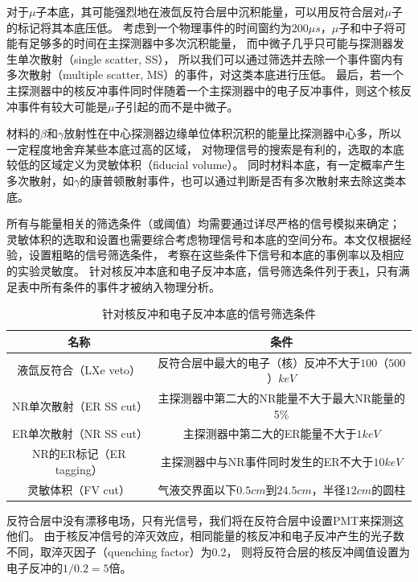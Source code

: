 对于$\mu$子本底，其可能强烈地在液氙反符合层中沉积能量，可以用反符合层对$\mu$子的标记将其本底压低。
考虑到一个物理事件的时间窗约为$200\mu s$，$\mu$子和中子将可能有足够多的时间在主探测器中多次沉积能量，
而中微子几乎只可能与探测器发生单次散射（single scatter, SS），
所以我们可以通过筛选并去除一个事件窗内有多次散射（multiple scatter, MS）的事件，对这类本底进行压低。
最后，若一个主探测器中的核反冲事件同时伴随着一个主探测器中的电子反冲事件，则这个核反冲事件有较大可能是$\mu$子引起的而不是中微子。

材料的$\beta$和$\gamma$放射性在中心探测器边缘单位体积沉积的能量比探测器中心多，所以一定程度地舍弃某些本底过高的区域，
对物理信号的搜索是有利的，选取的本底较低的区域定义为灵敏体积（fiducial volume）。
同时材料本底，有一定概率产生多次散射，如$\gamma$的康普顿散射事件，也可以通过判断是否有多次散射来去除这类本底。

所有与能量相关的筛选条件（或阈值）均需要通过详尽严格的信号模拟来确定；
灵敏体积的选取和设置也需要综合考虑物理信号和本底的空间分布。本文仅根据经验，设置粗略的信号筛选条件，
考察在这些条件下信号和本底的事例率以及相应的实验灵敏度。
针对核反冲本底和电子反冲本底，信号筛选条件列于表\ref{tab:cuts}，只有满足表中所有条件的事件才被纳入物理分析。

\begin{table}
  \centering
  \caption{针对核反冲和电子反冲本底的信号筛选条件}
  \begin{tabular}{cc}
    \toprule
    名称 & 条件 \\
    \midrule
    液氙反符合（LXe veto） & 反符合层中最大的电子（核）反冲不大于$100$（$500$）$\si{keV}$ \\
    NR单次散射（ER SS cut） & 主探测器中第二大的NR能量不大于最大NR能量的5\% \\
    ER单次散射（NR SS cut） & 主探测器中第二大的ER能量不大于$1\si{keV}$ \\
    NR的ER标记（ER tagging） & 主探测器中与NR事件同时发生的ER不大于$10\si{keV}$ \\
    灵敏体积（FV cut） & 气液交界面以下$0.5\si{cm}$到$24.5\si{cm}$，半径$12\si{cm}$的圆柱 \\
    \bottomrule
  \end{tabular}
  \label{tab:cuts}
\end{table}

反符合层中没有漂移电场，只有光信号，我们将在反符合层中设置PMT来探测这他们。
由于核反冲信号的淬灭效应，相同能量的核反冲和电子反冲产生的光子数不同，取淬灭因子（quenching factor）为0.2，
则将反符合层的核反冲阈值设置为电子反冲的$1/0.2=5$倍。

